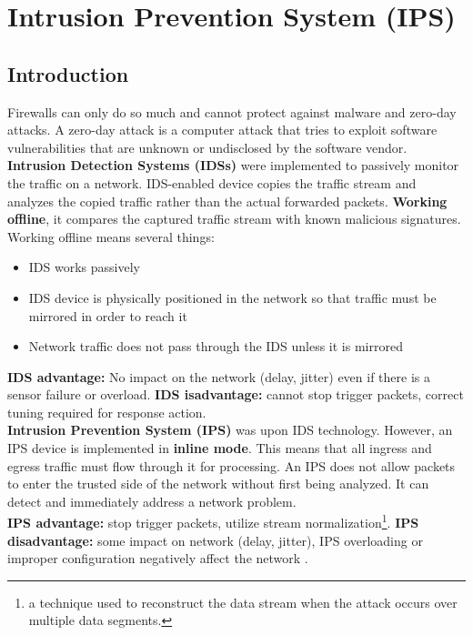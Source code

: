\chapter{Intrusion Prevention System (IPS)}

\section{Introduction}

Firewalls can only do so much and cannot protect against malware and zero-day attacks. A zero-day attack is a computer attack that tries to exploit software vulnerabilities that are unknown or undisclosed by the software vendor. \\

\textbf{Intrusion Detection Systems (IDSs)} were implemented to passively monitor the traffic on a network. IDS-enabled device copies the traffic stream and analyzes the copied traffic rather than the actual forwarded packets. \textbf{Working offline}, it compares the captured traffic stream with known malicious signatures. Working offline means several things:

\begin{itemize}
\item IDS works passively
\item IDS device is physically positioned in the network so that traffic must be mirrored in order to reach it
\item Network traffic does not pass through the IDS unless it is mirrored
\end{itemize}

\textbf{IDS advantage:} No impact on the network (delay, jitter) even if there is a sensor failure or overload. \textbf{IDS isadvantage:} cannot stop trigger packets, correct tuning required for response action. \\

\textbf{Intrusion Prevention System (IPS)} was upon IDS technology. However, an IPS device is implemented in \textbf{inline mode}. This means that all ingress and egress traffic must flow through it for processing. An IPS does not allow packets to enter the trusted side of the network without first being analyzed. It can detect and immediately address a network problem. \\

\textbf{IPS advantage:} stop trigger packets, utilize stream normalization\footnote{a technique used to reconstruct the data stream when the attack occurs over multiple data segments.}. \textbf{IPS disadvantage:} some impact on network (delay, jitter), IPS overloading or improper configuration negatively affect the network .\\

